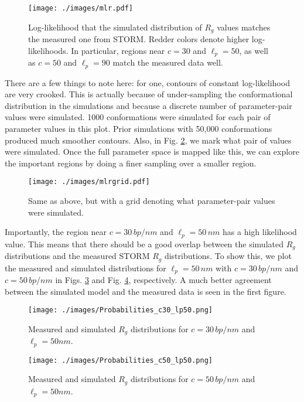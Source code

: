\documentclass[11pt]{article}
\begin{document}
\begin{figure}[htb]
\centering
\texttt{[image: ./images/mlr.pdf]}
\caption{\label{fig-mlr}Log-likelihood that the simulated distribution of $R_g$ values matches the measured one from STORM. Redder colors denote higher log-likelihoods. In particular, regions near $c=30$ and $\ell_p = 50$, as well as $c=50$ and $\ell_p = 90$ match the measured data well.}
\end{figure}

There are a few things to note here: for one, contours of constant
log-likelihood are very crooked. This is actually because of
under-sampling the conformational distribution in the simulations and
because a discrete number of parameter-pair values were
simulated. 1000 conformations were simulated for each pair of
parameter values in this plot. Prior simulations with 50,000
conformations produced much smoother contours. Also, in
Fig. \ref{fig-mlrgrid}, we mark what pair of values were
simulated. Once the full parameter space is mapped like this, we can
explore the important regions by doing a finer sampling over a smaller
region.

\begin{figure}[htb]
\centering
\texttt{[image: ./images/mlrgrid.pdf]}
\caption{\label{fig-mlrgrid}Same as above, but with a grid denoting what parameter-pair values were simulated.}
\end{figure}

Importantly, the region near $c=30 \, bp/nm$ and $\ell_p = 50 \, nm$
has a high likelihood value. This means that there should be a good
overlap between the simulated $R_g$ distributions and the measured
STORM $R_g$ distributions. To show this, we plot the measured and
simulated distributions for $\ell_p = 50 \, nm$ with $c=30 \, bp/nm$
and $c=50 \, bp/nm$ in Figs. \ref{fig-distc30} and
Fig. \ref{fig-distc50}, respectively. A much better agreement between
the simulated model and the measured data is seen in the first figure.

\begin{figure}[htb]
\centering
\texttt{[image: ./images/Probabilities\_c30\_lp50.png]}
\caption{\label{fig-distc30}Measured and simulated $R_g$ distributions for $c=30 \, bp/nm$ and $\ell_p = 50 nm$.}
\end{figure}

\begin{figure}[htb]
\centering
\texttt{[image: ./images/Probabilities\_c50\_lp50.png]}
\caption{\label{fig-distc50}Measured and simulated $R_g$ distributions for $c=50 \, bp/nm$ and $\ell_p = 50 nm$.}
\end{figure}
\end{document}
